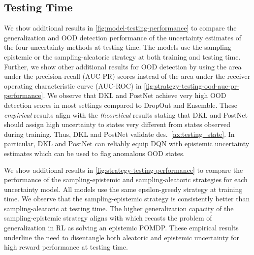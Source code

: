 
%
%
%

\subsection{Testing Time}

We show additional results in \cref{fig:model-testing-performance} to compare the generalization and OOD detection performance of the uncertainty estimates of the four uncertainty methods at testing time. The models use the sampling-epistemic or the sampling-aleatoric strategy at both training and testing time. Further, we show other additional results for OOD detection by using the area under the precision-recall (AUC-PR) scores instead of the area under the receiver operating characteristic curve (AUC-ROC) in \cref{fig:strategy-testing-ood-auc-pr-performance}. We observe that DKL and PostNet achieve  very high OOD detection scores in most settings  compared to DropOut and Ensemble. These \emph{empirical} results align with the \emph{theoretical} results stating that DKL and PostNet should assign high uncertainty to states very different from states observed during training. Thus, DKL and PostNet validate des.~\ref{ax:testing_state}. In particular, DKL and PostNet can reliably equip DQN with epistemic uncertainty estimates which can be used to flag anomalous OOD states.


%
%
%

We show additional results in \cref{fig:strategy-testing-performance} to compare the performance of the sampling-epistemic and sampling-aleatoric strategies for each uncertainty model. All models use the same epsilon-greedy strategy at training time. We observe that the sampling-epistemic strategy is consistently better than sampling-aleatoric at testing time. The higher generalization capacity of the sampling-epistemic strategy aligns with \citep{epistemic-pomdp} which recasts the problem of generalization in RL as solving an epistemic POMDP. These empirical results underline the need to disentangle both aleatoric and epistemic uncertainty for high reward performance at testing time.

